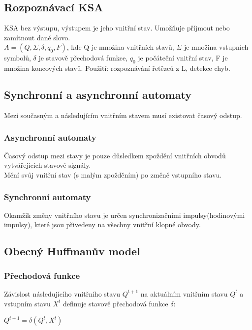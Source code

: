 \subsection{Rozpoznávací KSA}
KSA bez výstupu, výstupem je jeho vnitřní stav. Umožňuje příjmout nebo zamítnout dané slovo. \\
\(A = (Q, \Sigma, \delta, q_0, F) \), kde Q je množina vnitřních stavů, \(\Sigma \) je množina vstupních symbolů, \(\delta \) je stavově přechodová funkce, \(q_0\) je počáteční vnitřní stav, F je množina koncových stavů.
Použití: rozpoznávání řetězců z L, detekce chyb.\\

\subsection{Synchronní a asynchronní automaty}
Mezi současným a následujícím vnitřním stavem musí existovat časový odstup.\\
\subsubsection{Asynchronní automaty}
Časový odstup mezi stavy je pouze důsledkem zpoždění vnitřních obvodů vytvářejících stavové signály.\\
Mění svůj vnitřní stav (s malým zpožděním) po změně vstupního stavu.\\
\subsubsection{Synchronní automaty}
Okamžik změny vnitřního stavu je určen synchronizačními impulsy(hodinovými impulsy), které jsou přivedeny na všechny vnitřní klopné obvody.\\

\subsection{Obecný Huffmanův model}
\subsubsection{Přechodová funkce}
Závislost následujícího vnitřního stavu \(Q^{t+1}\) na aktuálním vnitřním stavu \(Q^t\) a vstupním stavu \(X^t\) definuje stavově přechodová funkce \(\delta \):
\begin{center}
    \(Q^{t+1} = \delta(Q^t,X^t)\)
\end{center}

